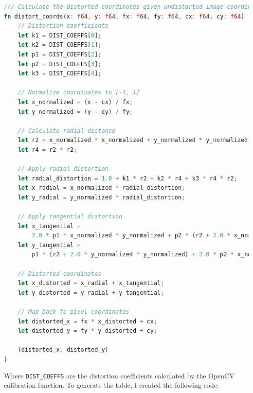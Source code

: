 \begin{lstlisting}[language=rust,breaklines,label={lst:distort_coords}]
/// Calculate the distorted coordinates given undistorted image coordinates.
fn distort_coords(x: f64, y: f64, fx: f64, fy: f64, cx: f64, cy: f64) -> (f64, f64) {
    // Distortion coefficients
    let k1 = DIST_COEFFS[0];
    let k2 = DIST_COEFFS[1];
    let p1 = DIST_COEFFS[2];
    let p2 = DIST_COEFFS[3];
    let k3 = DIST_COEFFS[4];

    // Normalize coordinates to [-1, 1]
    let x_normalized = (x - cx) / fx;
    let y_normalized = (y - cy) / fy;

    // Calculate radial distance
    let r2 = x_normalized * x_normalized + y_normalized * y_normalized;
    let r4 = r2 * r2;

    // Apply radial distortion
    let radial_distortion = 1.0 + k1 * r2 + k2 * r4 + k3 * r4 * r2;
    let x_radial = x_normalized * radial_distortion;
    let y_radial = y_normalized * radial_distortion;

    // Apply tangential distortion
    let x_tangential =
        2.0 * p1 * x_normalized * y_normalized + p2 * (r2 + 2.0 * x_normalized * x_normalized);
    let y_tangential =
        p1 * (r2 + 2.0 * y_normalized * y_normalized) + 2.0 * p2 * x_normalized * y_normalized;

    // Distorted coordinates
    let x_distorted = x_radial + x_tangential;
    let y_distorted = y_radial + y_tangential;

    // Map back to pixel coordinates
    let distorted_x = fx * x_distorted + cx;
    let distorted_y = fy * y_distorted + cy;

    (distorted_x, distorted_y)
}
\end{lstlisting}
Where \texttt{DIST\_COEFFS} are the distortion coefficients calculated by the OpenCV calibration function.
To generate the table, I created the following code:
